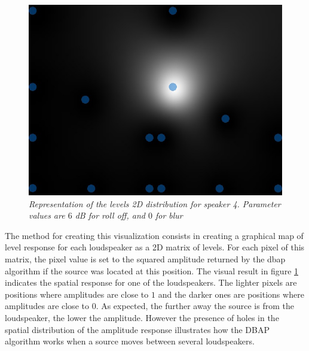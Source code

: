 \documentclass[twoside,10pt]{article}
\begin{document}
\begin{figure}[ht]
\centerline{\includegraphics[scale=0.5]{spk4_r_6_b_0}}
\caption{{\it Representation of the levels 2D distribution for speaker 4. Parameter values are $6$ dB for roll off, and $0$ for blur}}  
\label{fig:1spk}
\end{figure}


The method for creating this visualization consists in creating a graphical map of level response for each loudspeaker as a 2D matrix of levels. For each pixel of this matrix, the pixel value is set to the squared amplitude returned by the dbap algorithm if the source was located at this position. The visual result in figure \ref{fig:1spk} indicates the spatial response for one of the loudspeakers. The lighter pixels are positions where amplitudes are close to $1$ and the darker ones are positions where amplitudes are close to $0$. As expected, the further away the source is from the loudspeaker, the lower the amplitude. However the presence of holes in the spatial distribution of the amplitude response illustrates how the DBAP algorithm works when a source moves between several loudspeakers.

\end{document}
